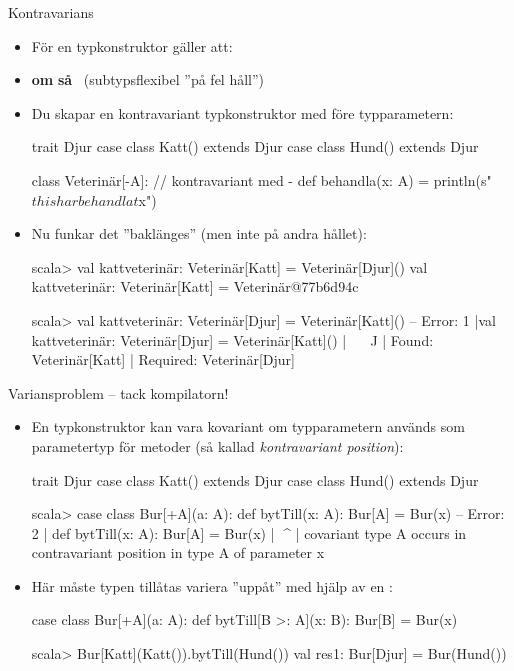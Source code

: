 \begin{Slide}{Kontravarians }
\begin{itemize}\SlideFontSmall
\item För en  typkonstruktor  gäller att: 
\item[] \textbf{om}  \textbf{så} ~(subtypsflexibel ''på fel håll'')
\item Du skapar en kontravariant typkonstruktor med \code{-} före typparametern:
\begin{Code}
trait Djur 
case class Katt() extends Djur
case class Hund() extends Djur

class Veterinär[-A]:    // kontravariant med -
  def behandla(x: A) = println(s"$this har behandlat $x")  
\end{Code}
\pause
\item Nu funkar det ''baklänges'' (men inte på andra hållet):
\begin{REPLsmall}
scala> val kattveterinär: Veterinär[Katt] = Veterinär[Djur]()
val kattveterinär: Veterinär[Katt] = Veterinär@77b6d94c

scala> val kattveterinär: Veterinär[Djur] = Veterinär[Katt]()
-- Error:
1 |val kattveterinär: Veterinär[Djur] = Veterinär[Katt]()
  |                                     ^^^^^^^^^^^^^^^^^
  |                                     Found:    Veterinär[Katt]
  |                                     Required: Veterinär[Djur]
\end{REPLsmall}
\end{itemize}

\end{Slide}

\begin{Slide}{Variansproblem -- tack kompilatorn!}
\begin{itemize}\SlideFontSmall
\item En typkonstruktor kan  vara kovariant om typparametern används som parametertyp för metoder (så kallad \emph{kontravariant position}):
\begin{Code}
trait Djur
case class Katt() extends Djur
case class Hund() extends Djur
\end{Code}
\begin{REPLsmall}
scala> case class Bur[+A](a: A): 
         def bytTill(x: A): Bur[A] = Bur(x)
-- Error:
2 |  def bytTill(x: A): Bur[A] = Bur(x)
  |          ^^^^
  |  covariant type A occurs in contravariant position in type A of parameter x
\end{REPLsmall}
\item Här måste typen tillåtas variera ''uppåt'' med hjälp av en :
\begin{Code}
case class Bur[+A](a: A): 
  def bytTill[B >: A](x: B): Bur[B] = Bur(x)
\end{Code}
\begin{REPLsmall}
scala> Bur[Katt](Katt()).bytTill(Hund())
val res1: Bur[Djur] = Bur(Hund())
\end{REPLsmall}
\end{itemize}
\end{Slide}

